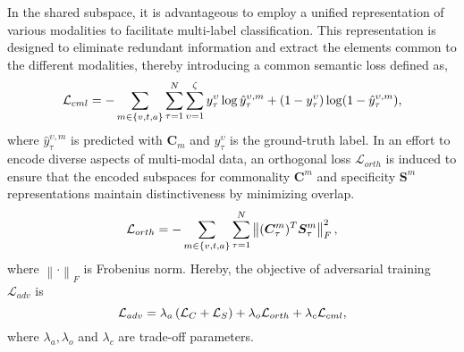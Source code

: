 In the shared subspace, it is advantageous to employ a unified representation of various modalities to facilitate multi-label classification. This representation is designed to eliminate redundant information and extract the elements common to the different modalities, thereby introducing a common semantic loss defined as,
% 
\begin{equation}
\vspace{-.1cm}
\small
\label{L_cml}
\mathcal{L}_{cml} = - \sum_{m \in \{v, t, a\}} \sum_{\tau=1}^{N} \sum_{\upsilon=1}^{\zeta} y_{\tau}^{\upsilon} \log \hat{y}_{\tau}^{\upsilon,m} + (1 - y_{\tau}^{\upsilon}) \log(1 - \hat{y}_{\tau}^{\upsilon,m}),
\end{equation}
where $\hat{y}_{\tau}^{\upsilon,m}$ is predicted with $\bm{C}_{m}$ and $y_{\tau}^{\upsilon}$ is the ground-truth label.
In an effort to encode diverse aspects of multi-modal data, an orthogonal loss $\mathcal{L}_{orth}$ is induced to ensure that the encoded subspaces for commonality $\bm{C}^{m}$ and specificity $\bm{S}^{m}$ representations maintain distinctiveness by minimizing overlap.
\begin{equation}
\vspace{-.1cm}
\small
\label{L_orth}
\mathcal{L}_{orth} = - \sum_{m \in \{v, t, a\}} \sum_{\tau=1}^{N} \left\| (\bm{C}_{\tau}^{m})^{T} \bm{S}_{\tau}^{m} \right\|_{F}^{2},
\end{equation}
where $\left\| \cdot \right\|_{F}$ is Frobenius norm. Hereby, the objective of adversarial training $\mathcal{L}_{adv}$ is
\begin{equation}
\small
\label{L_adv}
    \mathcal{L}_{adv} = \lambda_a\left ( \mathcal{L}_{C} + \mathcal{L}_{S}\right )+ \lambda_o \mathcal{L}_{orth}+ \lambda_c \mathcal{L}_{cml} ,
\end{equation}
where $\lambda_a,\lambda_o$ and $\lambda_c$ are trade-off parameters.



